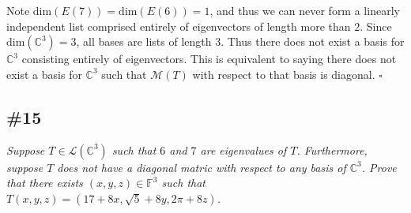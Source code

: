 \documentclass[12pt]{article}
\begin{document}
Note $\text{dim}(E(7)) = \text{dim}(E(6)) = 1$, and thus we can never form a linearly independent list comprised entirely of eigenvectors of length more than $2$.  Since $\text{dim}(\mathbb{C}^3) = 3$, all bases are lists of length $3$.  Thus there does not exist a basis for $\mathbb{C}^3$ consisting entirely of eigenvectors.  This is equivalent to saying there does not exist a basis for $\mathbb{C}^3$ such that $\mathcal{M}(T)$ with respect to that basis is diagonal. \hfill $\square$

\subsection*{\#15}
{\it Suppose $T \in \mathcal{L}(\mathbb{C}^3)$ such that $6$ and $7$ are eigenvalues of $T$.  Furthermore, suppose $T$ does not have a diagonal matric with respect to any basis of $\mathbb{C}^3$.  Prove that there exists $(x, y, z) \in \mathbb{F}^3$ such that $T(x, y, z) = (17 + 8x, \sqrt{5} + 8y, 2\pi + 8z)$.}
\end{document}
